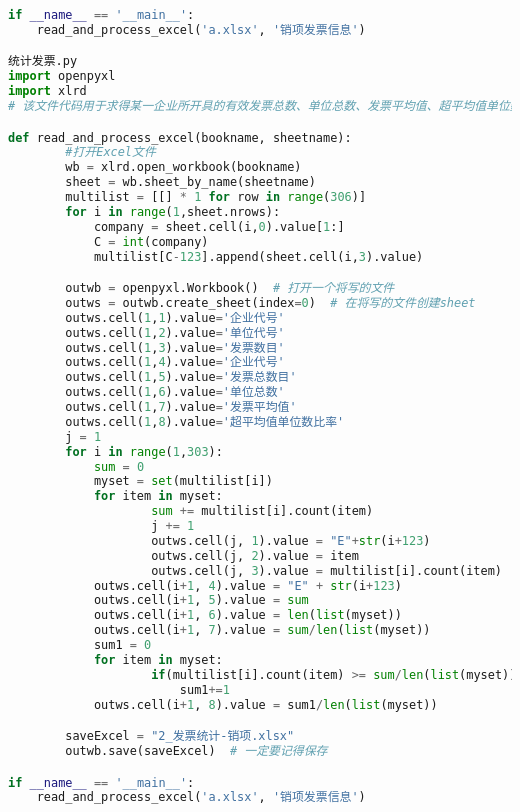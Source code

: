 \documentclass[withoutpreface,bwprint]{cumcmthesis}
\begin{document}
\begin{appendices}
\begin{lstlisting}[language=python]
if __name__ == '__main__':
    read_and_process_excel('a.xlsx', '销项发票信息')

统计发票.py
import openpyxl
import xlrd
# 该文件代码用于求得某一企业所开具的有效发票总数、单位总数、发票平均值、超平均值单位数比率

def read_and_process_excel(bookname, sheetname):
        #打开Excel文件
        wb = xlrd.open_workbook(bookname)
        sheet = wb.sheet_by_name(sheetname)
        multilist = [[] * 1 for row in range(306)]
        for i in range(1,sheet.nrows):
            company = sheet.cell(i,0).value[1:]
            C = int(company)
            multilist[C-123].append(sheet.cell(i,3).value)

        outwb = openpyxl.Workbook()  # 打开一个将写的文件
        outws = outwb.create_sheet(index=0)  # 在将写的文件创建sheet
        outws.cell(1,1).value='企业代号'
        outws.cell(1,2).value='单位代号'
        outws.cell(1,3).value='发票数目'
        outws.cell(1,4).value='企业代号'
        outws.cell(1,5).value='发票总数目'
        outws.cell(1,6).value='单位总数'
        outws.cell(1,7).value='发票平均值'
        outws.cell(1,8).value='超平均值单位数比率'
        j = 1
        for i in range(1,303):
            sum = 0
            myset = set(multilist[i])
            for item in myset:
                    sum += multilist[i].count(item)
                    j += 1
                    outws.cell(j, 1).value = "E"+str(i+123)
                    outws.cell(j, 2).value = item
                    outws.cell(j, 3).value = multilist[i].count(item)
            outws.cell(i+1, 4).value = "E" + str(i+123)
            outws.cell(i+1, 5).value = sum
            outws.cell(i+1, 6).value = len(list(myset))
            outws.cell(i+1, 7).value = sum/len(list(myset))
            sum1 = 0
            for item in myset:
                    if(multilist[i].count(item) >= sum/len(list(myset))):
                        sum1+=1
            outws.cell(i+1, 8).value = sum1/len(list(myset))

        saveExcel = "2_发票统计-销项.xlsx"
        outwb.save(saveExcel)  # 一定要记得保存

if __name__ == '__main__':
    read_and_process_excel('a.xlsx', '销项发票信息')
\end{lstlisting}
\end{appendices}
\end{document}
